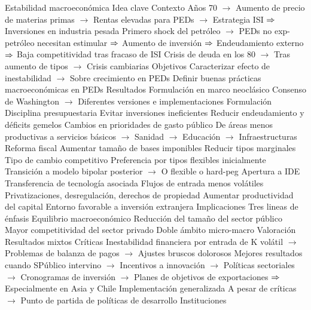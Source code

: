 \documentclass{nuevotema}
\begin{document}
\begin{esquemal}
		\2 Estabilidad macroeconómica
			\3 Idea clave
				\4 Contexto
				\4[] Años 70
				\4[] $\to$ Aumento de precio de materias primas
				\4[] $\to$ Rentas elevadas para PEDs
				\4[] $\to$ Estrategia ISI
				\4[] $\Rightarrow$ Inversiones en industria pesada
				\4[] Primero shock del petróleo
				\4[] $\to$ PEDs no exp-petróleo necesitan estimular
				\4[] $\Rightarrow$ Aumento de inversión
				\4[] $\Rightarrow$ Endeudamiento externo
				\4[] $\Rightarrow$ Baja competitividad tras fracaso de ISI
				\4[] Crisis de deuda en los 80
				\4[] $\to$ Tras aumento de tipos
				\4[] $\to$ Crisis cambiarias
				\4 Objetivos
				\4[] Caracterizar efecto de inestabilidad
				\4[] $\to$ Sobre crecimiento en PEDs
				\4[] Definir buenas prácticas macroeconómicas en PEDs
				\4 Resultados
				\4[] Formulación en marco neoclásico
				\4[] Consenso de Washington
				\4[] $\to$ Diferentes versiones e implementaciones
			\3 Formulación
				\4[i] Disciplina presupuestaria
				\4[] Evitar inversiones ineficientes
				\4[] Reducir endeudamiento y déficits gemelos
				\4[ii] Cambios en prioridades de gasto público
				\4[] De áreas menos productivas a servicios básicos
				\4[] $\to$ Sanidad
				\4[] $\to$ Educación
				\4[] $\to$ Infraestructuras
				\4[iii] Reforma fiscal
				\4[] Aumentar tamaño de bases imponibles
				\4[] Reducir tipos marginales
				\4[iv] Tipo de cambio competitivo
				\4[] Preferencia por tipos flexibles inicialmente
				\4[] Transición a modelo bipolar posterior
				\4[] $\to$ O flexible o hard-peg
				\4[v] Apertura a IDE
				\4[] Transferencia de tecnología asociada
				\4[] Flujos de entrada menos volátiles
				\4[vi] Privatizaciones, desregulación, derechos de propiedad
				\4[] Aumentar productividad del capital
				\4[] Entorno favorable a inversión extranjera
			\3 Implicaciones
				\4 Tres lineas de énfasis
				\4[] Equilibrio macroeconómico
				\4[] Reducción del tamaño del sector público
				\4[] Mayor competitividad del sector privado
				\4 Doble ámbito micro-macro
			\3 Valoración
				\4 Resultados mixtos
				\4 Críticas
				\4[] Inestabilidad financiera por entrada de K volátil
				\4[] $\to$ Problemas de balanza de pagos
				\4[] $\to$ Ajustes bruscos dolorosos
				\4[] Mejores resultados cuando SPúblico intervino
				\4[] $\to$ Incentivos a innovación
				\4[] $\to$ Políticas sectoriales
				\4[] $\to$ Cronogramas de inversión
				\4[] $\to$ Planes de objetivos de exportaciones
				\4[] $\Rightarrow$ Especialmente en Asia y Chile
				\4 Implementación generalizada
				\4[] A pesar de críticas
				\4[] $\to$ Punto de partida de políticas de desarrollo
		\2 Instituciones

\end{esquemal}
\end{document}
